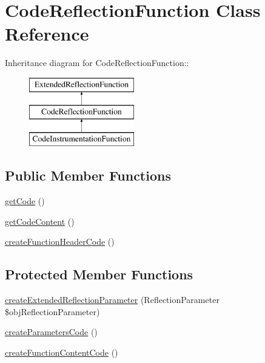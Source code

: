 \hypertarget{class_code_reflection_function}{
\section{CodeReflectionFunction Class Reference}
\label{class_code_reflection_function}
}
Inheritance diagram for CodeReflectionFunction::\begin{figure}[H]
\begin{center}
\leavevmode
\includegraphics[height=3cm]{class_code_reflection_function}
\end{center}
\end{figure}
\subsection*{Public Member Functions}
\begin{CompactItemize}
\item 
\hyperlink{class_code_reflection_function_b5e24da53b4a0d0848b18c1e832f47ff}{getCode} ()
\item 
\hyperlink{class_code_reflection_function_5796d91d5436d3d7e80b65f0913f1873}{getCodeContent} ()
\item 
\hyperlink{class_code_reflection_function_50033a1ad949372dc9cd146843ffbdae}{createFunctionHeaderCode} ()
\end{CompactItemize}
\subsection*{Protected Member Functions}
\begin{CompactItemize}
\item 
\hyperlink{class_code_reflection_function_98ceb248f2b535a3a83ac2e7990e0c1f}{createExtendedReflectionParameter} (ReflectionParameter \$objReflectionParameter)
\item 
\hyperlink{class_code_reflection_function_bcae75d179d0d3b4c5d5aafcd3f3bcdc}{createParametersCode} ()
\item 
\hyperlink{class_code_reflection_function_fac80923f7b3c20b2373b50bb2116287}{createFunctionContentCode} ()
\end{CompactItemize}


